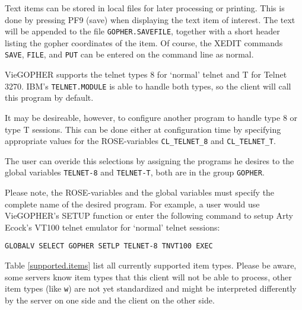 
Text items can be stored in local files for later processing or printing.
This is done by pressing PF9 (save) when displaying the text item
of interest.  The text will be appended to the file {\tt GOPHER.SAVEFILE},
together with a short header listing the gopher coordinates of the item.
  Of course, the XEDIT commands {\tt SAVE}, {\tt FILE},
and {\tt PUT} can be entered on the command line as normal.




VieGOPHER supports the telnet types 8 for `normal' telnet and T for
Telnet 3270.  IBM's {\tt TELNET.MODULE} is able to handle both types,
so the client will call this program by default.

It may be desireable,
however, to configure another program to handle type 8 or type T
sessions.  This can be done either at configuration time by specifying
appropriate values for the ROSE-variables {\tt CL\_TELNET\_8} and
{\tt CL\_TELNET\_T}.

The user can overide this selections by assigning the programs he
desires to the global variables {\tt TELNET-8} and {\tt TELNET-T},
both are in the group {\tt GOPHER}.

Please note, the ROSE-variables and the global variables must specify
the complete name of the desired program.  For example, a user would
use VieGOPHER's SETUP function or
enter the following command to setup Arty Ecock's VT100 telnet emulator
for `normal' telnet sessions:

\begin{verbatim}
GLOBALV SELECT GOPHER SETLP TELNET-8 TNVT100 EXEC
\end{verbatim}




Table \ref{supported.items} list all currently supported item
types.  Please be aware, some servers know item types that this
client will not be able to process, other item types (like {\tt w})
are not yet standardized and might be interpreted differently by
the server on one side and the client on the other side.



